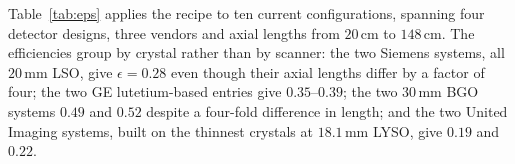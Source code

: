 \documentclass[11pt,a4paper]{article}
\newcommand{\Lpet}{L_{\mathrm{PET}}}
\newcommand{\Lsrc}{L_{\mathrm{s}}}
\newcommand{\Lmrd}{L_{\mathrm{MRD}}}
\newcommand{\Dpet}{D_{\mathrm{PET}}}
\newcommand{\Sid}{S_{\mathrm{ideal}}}
\newcommand{\Snema}{S_{\mathrm{NEMA}}}
\begin{document}
%
%

Table~\ref{tab:eps} applies the recipe to ten current configurations, spanning four
detector designs, three vendors and axial lengths from $20\,\mathrm{cm}$ to
$148\,\mathrm{cm}$. The efficiencies group by crystal rather than by scanner: the two
Siemens systems, all $20\,\mathrm{mm}$ LSO, give $\epsilon=0.28$ even though their axial
lengths differ by a factor of four; the two GE lutetium-based entries give $0.35$--$0.39$;
the two $30\,\mathrm{mm}$ BGO systems $0.49$ and $0.52$ despite a four-fold difference in
length; and the two United Imaging systems, built on the thinnest crystals at
$18.1\,\mathrm{mm}$ LYSO, give $0.19$ and $0.22$. 
\end{document}
